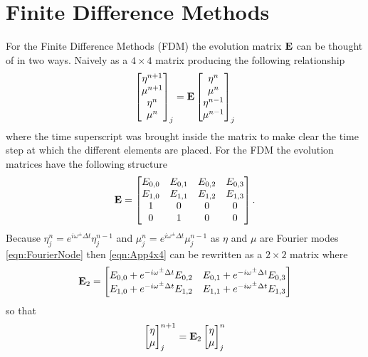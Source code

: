 \section{Finite Difference Methods}
For the Finite Difference Methods (FDM) the evolution matrix $\mathbf{E}$ can be thought of in two ways. Naively as a $4\times4$ matrix producing the following relationship
\begin{equation}
\label{eqn:App4x4Def}
\begin{bmatrix}
{\eta}^{n+1} \\{\mu}^{n+1} \\ {\eta}^{n} \\{\mu}^{n} 
\end{bmatrix}_j = \mathbf{E} \begin{bmatrix}{\eta}^{n} \\{\mu}^{n} \\ {\eta}^{n-1} \\{\mu}^{n-1} 
\end{bmatrix}_j
\end{equation} 
where the time superscript was brought inside the matrix to make clear the time step at which the different elements are placed. For the FDM the evolution matrices have the following structure
\begin{equation}
\label{eqn:App4x4}
\mathbf{E} = \begin{bmatrix}E_{0,0} & E_{0,1} & E_{0,2} & E_{0,3}\\
E_{1,0} & E_{1,1} & E_{1,2} & E_{1,3}\\
1 & 0 & 0 & 0\\
0 & 1 & 0 & 0\\
\end{bmatrix}.
\end{equation}
Because ${\eta}^{n}_j = e^{i \omega^\pm \Delta t}{\eta}^{n-1}_j $ and ${\mu}^{n}_j = e^{i \omega^\pm \Delta t}{\mu}^{n-1}_j$ as $\eta$ and $\mu$ are Fourier modes \eqref{eqn:FourierNode} then \eqref{eqn:App4x4} can be rewritten as a $2 \times 2$ matrix
where
\begin{equation}
\label{eqn:App4x4D1}
\mathbf{E}_2 = \begin{bmatrix}E_{0,0} + e^{-i \omega^{\pm }\Delta t} E_{0,2} & E_{0,1} + e^{-i \omega^{\pm }\Delta t} E_{0,3} \\
E_{1,0} + e^{-i \omega^{\pm }\Delta t} E_{1,2} & E_{1,1} + e^{-i \omega^{\pm }\Delta t} E_{1,3} \\
\end{bmatrix}
\end{equation}
so that
\begin{equation}
\begin{bmatrix}
{\eta} \\{\mu}
\end{bmatrix}^{n+1} _j = \mathbf{E}_2 \begin{bmatrix}{\eta} \\{\mu}
\end{bmatrix}^{n} _j
\end{equation} 

